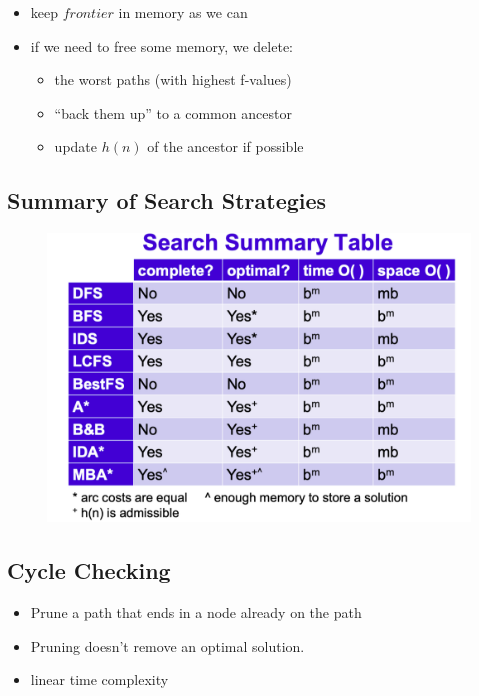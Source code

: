 \documentclass{article}
\begin{document}
\begin{itemize}
    \item keep $frontier$ in memory as we can
    \item if we need to free some memory, we delete:
        \begin{itemize}
            \item the worst paths (with highest f-values)
            \item ``back them up'' to a common ancestor
            \item update $h(n)$ of the ancestor if possible
        \end{itemize}
\end{itemize}

\subsection{Summary of Search Strategies}

\begin{figure}[H]
    \includegraphics[width=\textwidth]{summary_of_search_strategies}
    \centering
\end{figure}

\subsection{Cycle Checking}

\begin{itemize}
    \item Prune a path that ends in a node already on the path
    \item Pruning doesn't remove an optimal solution.
    \item linear time complexity
\end{itemize}
\end{document}
